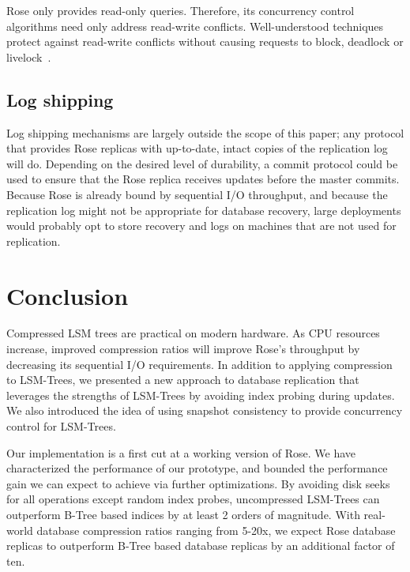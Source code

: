 \documentclass{vldb}
\newcommand{\rows}{Rose\xspace}
\newcommand{\rowss}{Rose's\xspace}
\begin{document}
\rows only provides read-only queries.  Therefore, its concurrency
control algorithms need only address read-write conflicts.
Well-understood techniques protect against read-write conflicts
without causing requests to block, deadlock or
livelock~\cite{concurrencyControl}.

\subsection{Log shipping}

Log shipping mechanisms are largely outside the scope of this paper;
any protocol that provides \rows replicas with up-to-date, intact
copies of the replication log will do.  Depending on the desired level
of durability, a commit protocol could be used to ensure that the
\rows replica receives updates before the master commits.  Because
\rows is already bound by sequential I/O throughput, and because the
replication log might not be appropriate for database recovery, large
deployments would probably opt to store recovery and logs on machines
that are not used for replication.

\section{Conclusion}

Compressed LSM trees are practical on modern hardware.  As CPU
resources increase, improved compression ratios will improve \rowss
throughput by decreasing its sequential I/O requirements.  In addition
to applying compression to LSM-Trees, we presented a new approach to
database replication that leverages the strengths of LSM-Trees
by avoiding index probing during updates.  We also introduced the idea of using
snapshot consistency to provide concurrency control for LSM-Trees.

Our implementation is a first cut at a working version of \rows.
We have characterized the performance of our prototype, and
bounded the performance gain we can expect to achieve via further
optimizations.  By avoiding disk seeks for all operations except
random index probes, uncompressed LSM-Trees can outperform
B-Tree based indices by at least 2 orders of magnitude.  With real-world
database compression ratios ranging from 5-20x, we expect \rows
database replicas to outperform B-Tree based database replicas by an
additional factor of ten.
\end{document}
